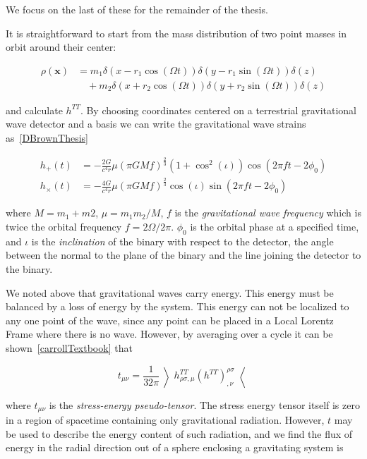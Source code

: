 We focus on the last of these for the remainder of the thesis.

It is straightforward to start from the mass distribution of two point
masses in orbit around their center:

\begin{align*}
\rho(\mathbf{x}) &= m_1\delta(x - r_1\cos(\Omega t)) \delta(y-r_1
\sin(\Omega t)) \delta(z) \\
&\quad + m_2\delta(x + r_2\cos(\Omega t)) \delta(y + r_2 \sin(\Omega t))
\delta(z)
\end{align*}

and calculate $h^{TT}$. By choosing coordinates centered on a
terrestrial gravitational wave detector and a basis we can write
the gravitational wave strains as~\ref{DBrownThesis}

\begin{align}
\label{eq:h_plus_cross}
h_+(t)   &= - \frac{2G}{c^4 r} \mu (\pi G M f)^{\frac{2}{3}}
(1+\cos^2(\iota)) \cos(2\pi f t - 2\phi_0) \\ \nonumber
h_\times(t)  &= - \frac{4G}{c^4 r} \mu (\pi G M f)^{\frac{2}{3}}
\cos(\iota) \sin(2\pi f t - 2\phi_0) \nonumber
\end{align}

where $M = m_1+m2$, $\mu = m_1 m_2 / M$, $f$ is the
\emph{gravitational wave frequency} which is twice the orbital
frequency $f = 2\Omega/2\pi$. $\phi_0$ is the orbital phase at a
specified time, and $\iota$ is the \emph{inclination} of the binary
with respect to the detector, the angle between the normal to the
plane of the binary and the line joining the detector to the binary.

We noted above that gravitational waves carry energy.  This energy
must be balanced by a loss of energy by the system.  This energy can
not be localized to any one point of the wave, since any point can be
placed in a Local Lorentz Frame where there is no wave.  However, by
averaging over a cycle it can be shown~\ref{carrollTextbook} that

\begin{equation}
t_{\mu\nu} = \frac{1}{32 \pi} \left\rangle h^{TT}_{\rho \sigma,\mu}
(h^{TT})^{\rho\sigma}_{,\nu} \right\langle
\end{equation}

where $t_{\mu\nu}$ is the \emph{stress-energy pseudo-tensor}.  The
stress energy tensor itself is zero in a region of spacetime
containing only gravitational radiation.  However, $t$ may be used to
describe the energy content of such radiation, and we find the flux of
energy in the radial direction out of a sphere enclosing a gravitating
system is

